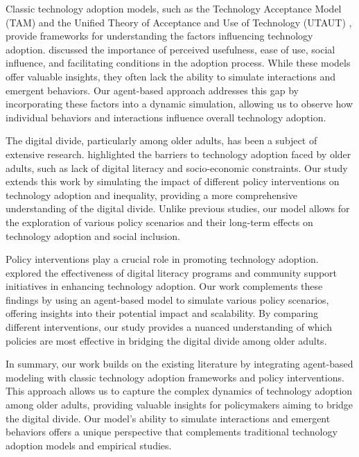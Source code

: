 \documentclass{article} %
\begin{document}
Classic technology adoption models, such as the Technology Acceptance Model (TAM) \citep{Davis1989PerceivedUP} and the Unified Theory of Acceptance and Use of Technology (UTAUT) \citep{Venkatesh2021UnifiedTO}, provide frameworks for understanding the factors influencing technology adoption. \citet{Niehaves2014InternetAB} discussed the importance of perceived usefulness, ease of use, social influence, and facilitating conditions in the adoption process. While these models offer valuable insights, they often lack the ability to simulate interactions and emergent behaviors. Our agent-based approach addresses this gap by incorporating these factors into a dynamic simulation, allowing us to observe how individual behaviors and interactions influence overall technology adoption.

The digital divide, particularly among older adults, has been a subject of extensive research. \citet{park2023generative} highlighted the barriers to technology adoption faced by older adults, such as lack of digital literacy and socio-economic constraints. Our study extends this work by simulating the impact of different policy interventions on technology adoption and inequality, providing a more comprehensive understanding of the digital divide. Unlike previous studies, our model allows for the exploration of various policy scenarios and their long-term effects on technology adoption and social inclusion.

Policy interventions play a crucial role in promoting technology adoption. \citet{shanahan2023role} explored the effectiveness of digital literacy programs and community support initiatives in enhancing technology adoption. Our work complements these findings by using an agent-based model to simulate various policy scenarios, offering insights into their potential impact and scalability. By comparing different interventions, our study provides a nuanced understanding of which policies are most effective in bridging the digital divide among older adults.

In summary, our work builds on the existing literature by integrating agent-based modeling with classic technology adoption frameworks and policy interventions. This approach allows us to capture the complex dynamics of technology adoption among older adults, providing valuable insights for policymakers aiming to bridge the digital divide. Our model's ability to simulate interactions and emergent behaviors offers a unique perspective that complements traditional technology adoption models and empirical studies.
\end{document}
